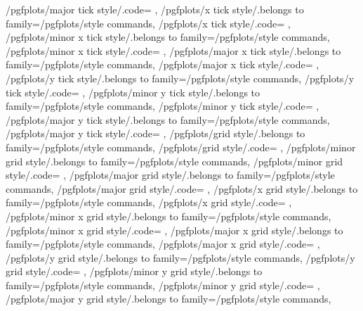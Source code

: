 {	/pgfplots/major tick style/.code={%
	},
	/pgfplots/x tick style/.belongs to family=/pgfplots/style commands,
	/pgfplots/x tick style/.code={%
	},
	/pgfplots/minor x tick style/.belongs to family=/pgfplots/style commands,
	/pgfplots/minor x tick style/.code={%
	},
	/pgfplots/major x tick style/.belongs to family=/pgfplots/style commands,
	/pgfplots/major x tick style/.code={%
	},
	/pgfplots/y tick style/.belongs to family=/pgfplots/style commands,
	/pgfplots/y tick style/.code={%
	},
	/pgfplots/minor y tick style/.belongs to family=/pgfplots/style commands,
	/pgfplots/minor y tick style/.code={%
	},
	/pgfplots/major y tick style/.belongs to family=/pgfplots/style commands,
	/pgfplots/major y tick style/.code={%
	},
	/pgfplots/grid style/.belongs to family=/pgfplots/style commands,
	/pgfplots/grid style/.code={%
	},
	/pgfplots/minor grid style/.belongs to family=/pgfplots/style commands,
	/pgfplots/minor grid style/.code={%
	},
	/pgfplots/major grid style/.belongs to family=/pgfplots/style commands,
	/pgfplots/major grid style/.code={%
	},
	/pgfplots/x grid style/.belongs to family=/pgfplots/style commands,
	/pgfplots/x grid style/.code={%
	},
	/pgfplots/minor x grid style/.belongs to family=/pgfplots/style commands,
	/pgfplots/minor x grid style/.code={%
	},
	/pgfplots/major x grid style/.belongs to family=/pgfplots/style commands,
	/pgfplots/major x grid style/.code={%
	},
	/pgfplots/y grid style/.belongs to family=/pgfplots/style commands,
	/pgfplots/y grid style/.code={%
	},
	/pgfplots/minor y grid style/.belongs to family=/pgfplots/style commands,
	/pgfplots/minor y grid style/.code={%
	},
	/pgfplots/major y grid style/.belongs to family=/pgfplots/style commands,
}

